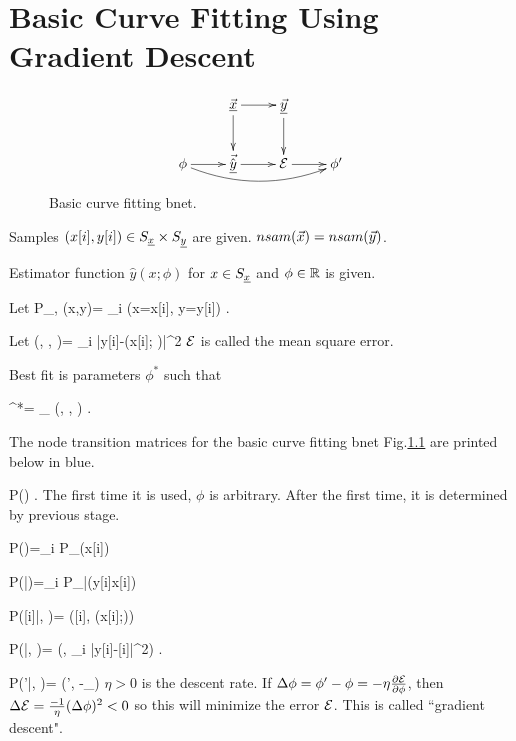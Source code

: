 \chapter{Basic Curve Fitting
Using Gradient Descent}
\label{chap-basic-fit}

\begin{figure}[h!]
\centering
$$\xymatrix{
&\vec{\rvx}\ar[d]\ar[r]&\ul{\vecy}
\ar[d]&\\
\phi\ar[r]\ar@/_1pc/[rrr]&
\vec{\hat{\rvy}}\ar[r]&\cale\ar[r]&\phi'
}$$
\caption{Basic curve fitting bnet.}
\label{fig-bfit}
\end{figure}


Samples 
$(x[i], y[i])\in S_{\underline{x}}\times S_{\underline{y}}$
are given. $nsam({\vec{x}})=nsam({\vec{y}})$.

Estimator function 
$\hat{y}(x; \phi)$
for $x\in S_{\underline{x}}$ and $\phi\in{ \mathbb{R}}$
is given.

Let 
\beq
P_{\rvx, \rvy}(x,y)=
\sum_i \indi(x=x[i], y=y[i])
\;.
\eeq


Let 
\beq
\cale(\vecx, \vecy, \phi)=
\sum_i
|y[i]-(x[i]; \phi)|^2
\;
\eeq
${\cal E}$ is called the mean square error.

Best fit is parameters $\phi^*$
such that

\beq 
\phi^*= _\phi
\cale(\vecx, \vecy, \phi)
\;.
\eeq

The node transition matrices for
the basic curve fitting bnet
 Fig.\ref{fig-bfit} are
printed below in blue.

\beq\color{blue}
P(\phi) 
\;.
\eeq
The first time
it is used, $\phi$ is arbitrary.
After the first time, it is determined 
by previous stage.

\beq\color{blue}
P(\vecx)=\prod_i P_\rvx(x[i])
\eeq

\beq\color{blue}
P(\vecy|\vecx)=\prod_i P_{\rvy|\rvx}(y[i]\cond x[i])
\eeq

\beq\color{blue}
P([i]|\phi, \vecx)=
\delta([i], (x[i];\phi))
\eeq


\beq\color{blue}
P(\cale|, \vecy)=
\delta(\cale,
\sum_i |y[i]-[i]|^2)
\;.
\eeq


\beq\color{blue}
P(\phi'|\phi, \cale)=
\delta(\phi',
\phi-\eta\partial_\phi\cale)
\eeq
$\eta>0$ is the descent rate.
If $\Delta \phi=\phi'-\phi=-\eta 
\frac{\partial{\cal E}}
{\partial \phi}$, then
 $\Delta {\cal E}=\frac{-1}{\eta}
(\Delta\phi)^2<0$  so this will
minimize the error
${\cal E}$.
This is called ``gradient descent".